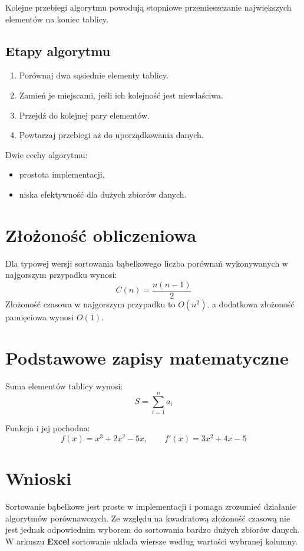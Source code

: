     Kolejne przebiegi algorytmu powodują stopniowe przemieszczanie największych
    elementów na koniec tablicy.

    \subsection{Etapy algorytmu}

    \begin{enumerate}
        \item Porównaj dwa sąsiednie elementy tablicy.
        \item Zamień je miejscami, jeśli ich kolejność jest niewłaściwa.
        \item Przejdź do kolejnej pary elementów.
        \item Powtarzaj przebiegi aż do uporządkowania danych.
    \end{enumerate}
    Dwie cechy algorytmu:
    \begin{itemize}
        \item prostota implementacji,
        \item niska efektywność dla dużych zbiorów danych.
    \end{itemize}

\section{Złożoność obliczeniowa}

Dla typowej wersji sortowania bąbelkowego liczba porównań wykonywanych
w najgorszym przypadku wynosi:
\begin{equation}
    C(n) = \frac{n(n-1)}{2}
\end{equation}
Złożoność czasowa w najgorszym przypadku to \(O(n^2)\).
a dodatkowa złożoność pamięciowa wynosi \(O(1)\).
\section{Podstawowe zapisy matematyczne}
Suma elementów tablicy wynosi:
\[
    S = \sum_{i=1}^{n} a_i
\]

Funkcja i jej pochodna:
\[
    f(x) = x^3 + 2x^2 -5x, \qquad f'(x) = 3x^2 + 4x - 5
\]
\section{Wnioski}

Sortowanie bąbelkowe jest proste w implementacji i pomaga zrozumieć działanie
algorytmów porównawczych. Ze względu na kwadratową złożoność czasową nie jest
jednak odpowiednim wyborem do sortowania bardzo dużych zbiorów danych.
W arkuszu \textbf{Excel} sortowanie układa wiersze według wartości wybranej kolumny.